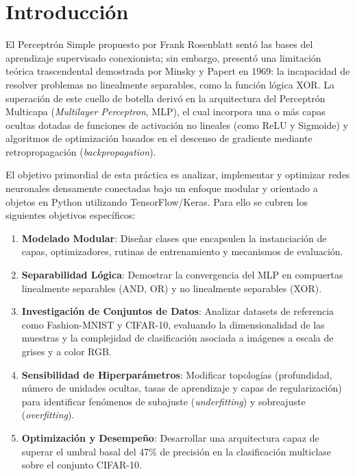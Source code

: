 \documentclass[12pt]{article}
\begin{document}
	\section{Introducción}
	El Perceptrón Simple propuesto por Frank Rosenblatt sentó las bases del aprendizaje supervisado conexionista; sin embargo, presentó una limitación teórica trascendental demostrada por Minsky y Papert en 1969: la incapacidad de resolver problemas no linealmente separables, como la función lógica XOR. La superación de este cuello de botella derivó en la arquitectura del Perceptrón Multicapa (\textit{Multilayer Perceptron}, MLP), el cual incorpora una o más capas ocultas dotadas de funciones de activación no lineales (como ReLU y Sigmoide) y algoritmos de optimización basados en el descenso de gradiente mediante retropropagación (\textit{backpropagation}).
	
	El objetivo primordial de esta práctica es analizar, implementar y optimizar redes neuronales densamente conectadas bajo un enfoque modular y orientado a objetos en Python utilizando TensorFlow/Keras. Para ello se cubren los siguientes objetivos específicos:
	\begin{enumerate}
		\item \textbf{Modelado Modular}: Diseñar clases que encapsulen la instanciación de capas, optimizadores, rutinas de entrenamiento y mecanismos de evaluación.
		\item \textbf{Separabilidad Lógica}: Demostrar la convergencia del MLP en compuertas linealmente separables (AND, OR) y no linealmente separables (XOR).
		\item \textbf{Investigación de Conjuntos de Datos}: Analizar datasets de referencia como Fashion-MNIST y CIFAR-10, evaluando la dimensionalidad de las muestras y la complejidad de clasificación asociada a imágenes a escala de grises y a color RGB.
		\item \textbf{Sensibilidad de Hiperparámetros}: Modificar topologías (profundidad, número de unidades ocultas, tasas de aprendizaje y capas de regularización) para identificar fenómenos de subajuste (\textit{underfitting}) y sobreajuste (\textit{overfitting}).
		\item \textbf{Optimización y Desempeño}: Desarrollar una arquitectura capaz de superar el umbral basal del 47\% de precisión en la clasificación multiclase sobre el conjunto CIFAR-10.
	\end{enumerate}
	
\end{document}
